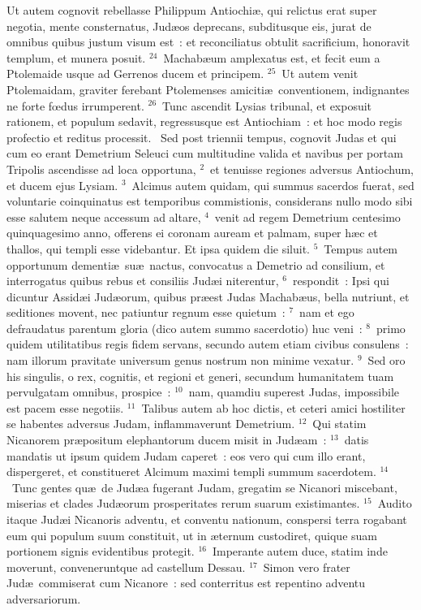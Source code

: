  Ut autem cognovit rebellasse Philippum Antiochi\ae , qui relictus erat super negotia, mente consternatus, Jud\ae os deprecans, subditusque eis, jurat de omnibus quibus justum visum est~: et reconciliatus obtulit sacrificium, honoravit templum, et munera posuit.
${}^{24}$~Machab\ae um amplexatus est, et fecit eum a Ptolemaide usque ad Gerrenos ducem et principem.
${}^{25}$~Ut autem venit Ptolemaidam, graviter ferebant Ptolemenses amiciti\ae\ conventionem, indignantes ne forte fœdus irrumperent.
${}^{26}$~Tunc ascendit Lysias tribunal, et exposuit rationem, et populum sedavit, regressusque est Antiochiam~: et hoc modo regis profectio et reditus processit.
~Sed post triennii tempus, cognovit Judas et qui cum eo erant Demetrium Seleuci cum multitudine valida et navibus per portam Tripolis ascendisse ad loca opportuna,
${}^{2}$~et tenuisse regiones adversus Antiochum, et ducem ejus Lysiam.
${}^{3}$~Alcimus autem quidam, qui summus sacerdos fuerat, sed voluntarie coinquinatus est temporibus commistionis, considerans nullo modo sibi esse salutem neque accessum ad altare,
${}^{4}$~venit ad regem Demetrium centesimo quinquagesimo anno, offerens ei coronam auream et palmam, super h\ae c et thallos, qui templi esse videbantur. Et ipsa quidem die siluit.
${}^{5}$~Tempus autem opportunum dementi\ae\ su\ae\ nactus, convocatus a Demetrio ad consilium, et interrogatus quibus rebus et consiliis Jud\ae i niterentur,
${}^{6}$~respondit~: Ipsi qui dicuntur Assid\ae i Jud\ae orum, quibus pr\ae est Judas Machab\ae us, bella nutriunt, et seditiones movent, nec patiuntur regnum esse quietum~:
${}^{7}$~nam et ego defraudatus parentum gloria (dico autem summo sacerdotio) huc veni~:
${}^{8}$~primo quidem utilitatibus regis fidem servans, secundo autem etiam civibus consulens~: nam illorum pravitate universum genus nostrum non minime vexatur.
${}^{9}$~Sed oro his singulis, o rex, cognitis, et regioni et generi, secundum humanitatem tuam pervulgatam omnibus, prospice~:
${}^{10}$~nam, quamdiu superest Judas, impossibile est pacem esse negotiis.
${}^{11}$~Talibus autem ab hoc dictis, et ceteri amici hostiliter se habentes adversus Judam, inflammaverunt Demetrium.
${}^{12}$~Qui statim Nicanorem pr\ae positum elephantorum ducem misit in Jud\ae am~:
${}^{13}$~datis mandatis ut ipsum quidem Judam caperet~: eos vero qui cum illo erant, dispergeret, et constitueret Alcimum maximi templi summum sacerdotem.
${}^{14}$~Tunc gentes qu\ae\ de Jud\ae a fugerant Judam, gregatim se Nicanori miscebant, miserias et clades Jud\ae orum prosperitates rerum suarum existimantes.
${}^{15}$~Audito itaque Jud\ae i Nicanoris adventu, et conventu nationum, conspersi terra rogabant eum qui populum suum constituit, ut in \ae ternum custodiret, quique suam portionem signis evidentibus protegit.
${}^{16}$~Imperante autem duce, statim inde moverunt, conveneruntque ad castellum Dessau.
${}^{17}$~Simon vero frater Jud\ae\ commiserat cum Nicanore~: sed conterritus est repentino adventu adversariorum.


